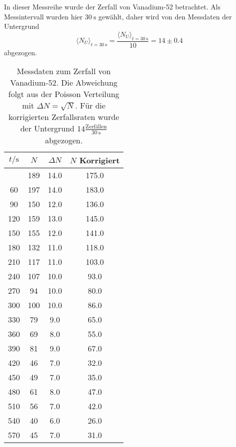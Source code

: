 In dieser Messreihe wurde der Zerfall von Vanadium-52 betrachtet. Als Messintervall wurden hier
$\SI{30}{\second}$ gewählt, daher wird von den Messdaten der Untergrund
\begin{equation}
	\langle N_U \rangle_{t=\SI{30}{\second}} = 
	\frac{\langle N_U \rangle_{t=\SI{30}{\second}}}{10} = 14 \pm 0.4
\end{equation}
abgezogen.

\begin{longtable}{c c c c}
	\caption{Messdaten zum Zerfall von Vanadium-52. Die Abweichung folgt aus der Poisson Verteilung
		mit $\Delta N = \sqrt{N}$. Für die korrigierten Zerfallsraten wurde der Untergrund 
	$14 \frac{\text{Zerfällen}}{\SI{30}{\second}}$ abgezogen.} \label{tab:vanadium} \\
		\hline
		$t / \si{\second}$ & $N$ & $\Delta N$ &$N$ Korrigiert \\
		\hline
		\endhead
		\hline
		\endfoot
		30   	&      189  	& 14.0 &      175.0 \\
		  60   	&      197  	& 14.0 &      183.0 \\
		  90   	&      150  	& 12.0 &      136.0 \\
		 120   	&      159  	& 13.0 &      145.0 \\
		 150   	&      155  	& 12.0 &      141.0 \\
		 180   	&      132  	& 11.0 &      118.0 \\
		 210   	&      117  	& 11.0 &      103.0 \\
		 240   	&      107  	& 10.0 &       93.0 \\
		 270   	&       94  	& 10.0 &       80.0 \\
		 300   	&      100  	& 10.0 &       86.0 \\
		 330   	&       79  	&  9.0 &       65.0 \\
		 360   	&       69  	&  8.0 &       55.0 \\
		 390   	&       81  	&  9.0 &       67.0 \\
		 420   	&       46  	&  7.0 &       32.0 \\
		 450   	&       49  	&  7.0 &       35.0 \\
		 480   	&       61  	&  8.0 &       47.0 \\
		 510   	&       56  	&  7.0 &       42.0 \\
		 540   	&       40  	&  6.0 &       26.0 \\
		 570   	&       45  	&  7.0 &       31.0 \\

\end{longtable}
